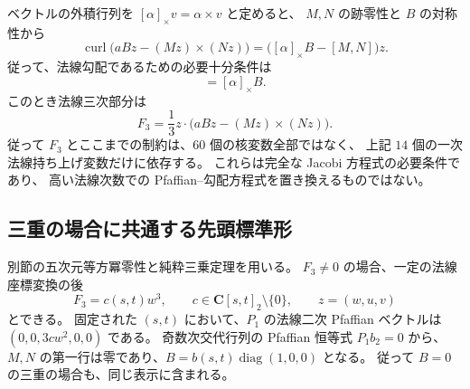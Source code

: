 \documentclass[11pt,a4paper]{ltjsarticle}
\theoremstyle{remark}\newtheorem{remark}[theorem]{注意}
\begin{document}
ベクトルの外積行列を $[\alpha]_\times v=\alpha\times v$ と定めると、
$M,N$ の跡零性と $B$ の対称性から
\begin{equation}
 \operatorname{curl}\bigl(aBz-(Mz)\times(Nz)\bigr)
 =\bigl([\alpha]_\times B-[M,N]\bigr)z.
 \label{eq:v17-curl}
\end{equation}
従って、法線勾配であるための必要十分条件は
\begin{equation}
 [M,N]=[\alpha]_\times B.
 \label{eq:v17-commutator}
\end{equation}
このとき法線三次部分は
\begin{equation}
 F_3=\frac13 z\cdot\bigl(aBz-(Mz)\times(Nz)\bigr).
 \label{eq:v17-f3}
\end{equation}
従って $F_3$ とここまでの制約は、$60$ 個の核変数全部ではなく、
上記 $14$ 個の一次法線持ち上げ変数だけに依存する。
これらは完全な Jacobi 方程式の必要条件であり、
高い法線次数での Pfaffian--勾配方程式を置き換えるものではない。



\subsection{三重の場合に共通する先頭標準形}

別節の五次元等方冪零性と純粋三乗定理を用いる。
$F_3\ne0$ の場合、一定の法線座標変換の後
\[
 F_3=c(s,t)w^3,\qquad c\in\mathbf C[s,t]_2\setminus\{0\},
 \qquad z=(w,u,v)
\]
とできる。
固定された $(s,t)$ において、$P_1$ の法線二次 Pfaffian ベクトルは
$(0,0,3cw^2,0,0)$ である。
奇数次交代行列の Pfaffian 恒等式 $P_1b_2=0$ から、
$M,N$ の第一行は零であり、$B=b(s,t)\operatorname{diag}(1,0,0)$ となる。
従って $B=0$ の三重の場合も、同じ表示に含まれる。
\end{document}
